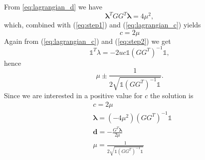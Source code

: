 \documentclass{article}
\renewcommand{\vec}[1]{\boldsymbol{#1}}
\newcommand{\onevec}{\mathds{1}}
\begin{document}
From \ref{eq:lagrangian_d} we have
\begin{equation}
	\vec{\lambda}^T GG^T \vec{\lambda} = 4\mu^2,
\end{equation} which, combined with (\ref{eq:step1}) and (\ref{eq:lagrangian_c}) yields
\begin{equation}
	c = 2\mu
\end{equation}
Again from (\ref{eq:lagrangian_c}) and (\ref{eq:step2}) we get
\begin{equation}
	\onevec^T\lambda = -2uc \onevec(GG^T)^{-1}\onevec,
\end{equation} hence 
\begin{equation}
	\mu \pm \frac{1}{2\sqrt{\onevec(GG^T)^{-1}\onevec}}.
\end{equation}
Since we are interested in a positive value for $c$ the solution is
\begin{align}
	& c = 2\mu\\
	&\vec{\lambda} = (-4\mu^2)(GG^T)^{-1} \onevec\\
	&\vec{d} = -\frac{G^T\vec{\lambda}}{2\mu}\\
	&\mu = \frac{1}{2\sqrt{\onevec(GG^T)^{-1}\onevec}}
\end{align}
\end{document}
